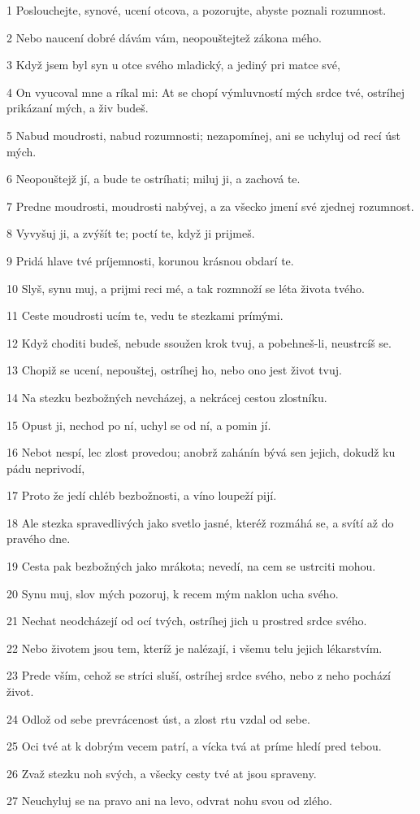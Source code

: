 \par 1 Poslouchejte, synové, ucení otcova, a pozorujte, abyste poznali rozumnost.
\par 2 Nebo naucení dobré dávám vám, neopouštejtež zákona mého.
\par 3 Když jsem byl syn u otce svého mladický, a jediný pri matce své,
\par 4 On vyucoval mne a ríkal mi: At se chopí výmluvností mých srdce tvé, ostríhej prikázaní mých, a živ budeš.
\par 5 Nabud moudrosti, nabud rozumnosti; nezapomínej, ani se uchyluj od recí úst mých.
\par 6 Neopouštejž jí, a bude te ostríhati; miluj ji, a zachová te.
\par 7 Predne moudrosti, moudrosti nabývej, a za všecko jmení své zjednej rozumnost.
\par 8 Vyvyšuj ji, a zvýšít te; poctí te, když ji prijmeš.
\par 9 Pridá hlave tvé príjemnosti, korunou krásnou obdarí te.
\par 10 Slyš, synu muj, a prijmi reci mé, a tak rozmnoží se léta života tvého.
\par 11 Ceste moudrosti ucím te, vedu te stezkami prímými.
\par 12 Když choditi budeš, nebude ssoužen krok tvuj, a pobehneš-li, neustrcíš se.
\par 13 Chopiž se ucení, nepouštej, ostríhej ho, nebo ono jest život tvuj.
\par 14 Na stezku bezbožných nevcházej, a nekrácej cestou zlostníku.
\par 15 Opust ji, nechod po ní, uchyl se od ní, a pomin jí.
\par 16 Nebot nespí, lec zlost provedou; anobrž zahánín bývá sen jejich, dokudž ku pádu neprivodí,
\par 17 Proto že jedí chléb bezbožnosti, a víno loupeží pijí.
\par 18 Ale stezka spravedlivých jako svetlo jasné, kteréž rozmáhá se, a svítí až do pravého dne.
\par 19 Cesta pak bezbožných jako mrákota; nevedí, na cem se ustrciti mohou.
\par 20 Synu muj, slov mých pozoruj, k recem mým naklon ucha svého.
\par 21 Nechat neodcházejí od ocí tvých, ostríhej jich u prostred srdce svého.
\par 22 Nebo životem jsou tem, kteríž je nalézají, i všemu telu jejich lékarstvím.
\par 23 Prede vším, cehož se stríci sluší, ostríhej srdce svého, nebo z neho pochází život.
\par 24 Odlož od sebe prevrácenost úst, a zlost rtu vzdal od sebe.
\par 25 Oci tvé at k dobrým vecem patrí, a vícka tvá at príme hledí pred tebou.
\par 26 Zvaž stezku noh svých, a všecky cesty tvé at jsou spraveny.
\par 27 Neuchyluj se na pravo ani na levo, odvrat nohu svou od zlého.

